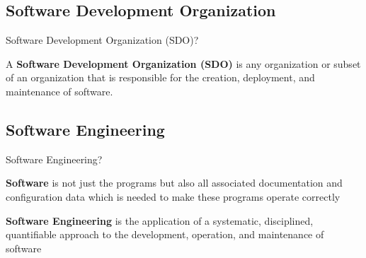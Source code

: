     \subsection{Software Development Organization}
    
        \begin{frame}{Software Development Organization (SDO)?}
            \begin{displayquote}
                 A \textbf{Software Development Organization (SDO)} is any
                 organization or subset of an organization that is 
                 responsible for the creation, deployment, and 
                 maintenance of software. 
            \end{displayquote}
        \end{frame}
        
    \subsection{Software Engineering}
        \begin{frame}{Software Engineering?}
            \begin{displayquote}
                 \textbf{Software} is not just the
                    programs but also all associated documentation and 
                    configuration data which is
                    needed to make these programs operate correctly
                    \cite{Sommerville2001}
            \end{displayquote} 
            
            \begin{displayquote}
                \textbf{Software Engineering} is the application 
                of a systematic, disciplined, quantifiable
                approach to the development, operation, and maintenance of software
                \cite{Ieee1990} 
            \end{displayquote} 
        \end{frame}
    
